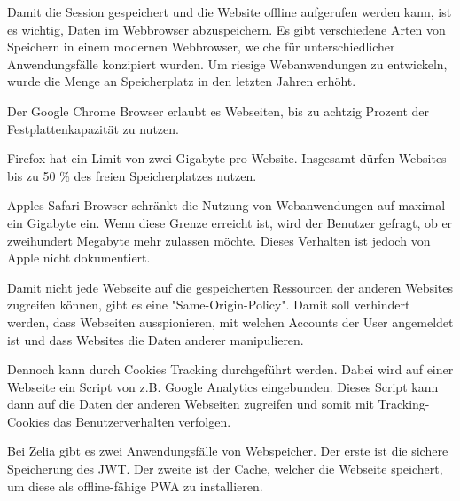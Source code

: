 

Damit die Session gespeichert und die Website offline aufgerufen werden kann, ist es wichtig, Daten im Webbrowser abzuspeichern. Es gibt verschiedene Arten von Speichern in einem modernen Webbrowser, welche für unterschiedlicher Anwendungsfälle konzipiert wurden. Um riesige Webanwendungen zu entwickeln, wurde die Menge an Speicherplatz in den letzten Jahren erhöht. 


Der Google Chrome Browser erlaubt es Webseiten, bis zu achtzig Prozent der Festplattenkapazität zu nutzen.

Firefox hat ein Limit von zwei Gigabyte pro Website. Insgesamt dürfen Websites bis zu 50 \% des freien Speicherplatzes nutzen.

Apples Safari-Browser schränkt die Nutzung von Webanwendungen auf maximal ein Gigabyte ein. Wenn diese Grenze erreicht ist, wird der Benutzer gefragt, ob er zweihundert Megabyte mehr zulassen möchte. Dieses Verhalten ist jedoch von Apple nicht dokumentiert.


Damit nicht jede Webseite auf die gespeicherten Ressourcen der anderen Websites zugreifen können, gibt es eine "Same-Origin-Policy". Damit soll verhindert werden, dass Webseiten ausspionieren, mit welchen Accounts der User angemeldet ist und dass Websites die Daten anderer manipulieren.

Dennoch kann durch Cookies Tracking durchgeführt werden. Dabei wird auf einer Webseite ein Script von z.B. Google Analytics eingebunden. Dieses Script kann dann auf die Daten der anderen Webseiten zugreifen und somit mit Tracking-Cookies das Benutzerverhalten verfolgen.











Bei Zelia gibt es zwei Anwendungsfälle von Webspeicher. Der erste ist die sichere Speicherung des JWT. Der zweite ist der Cache, welcher die Webseite speichert, um diese als offline-fähige PWA zu installieren.

